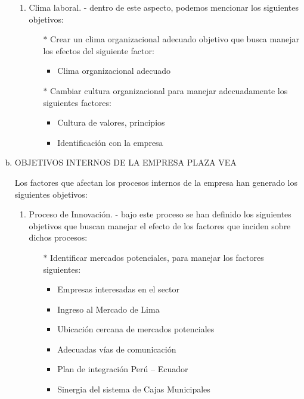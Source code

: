 \begin{enumerate}[a)]
\begin{enumerate}[1.]
  			  \item Clima laboral. - dentro de este aspecto, podemos mencionar los siguientes objetivos:

				\begin{itemize}

				\item[$*$] Crear un clima organizacional adecuado objetivo que busca manejar los efectos del siguiente factor:

				\begin{itemize}

  				  \item Clima organizacional adecuado

				\end{itemize}


				\item[$*$] Cambiar cultura organizacional para manejar adecuadamente los siguientes factores:

				\begin{itemize}

  				  \item Cultura de valores, principios
				  \item Identificación con la empresa

				\end{itemize}


			\end{itemize}
    
		\end{enumerate}

	\item OBJETIVOS INTERNOS DE LA EMPRESA PLAZA VEA

	Los factores que afectan los procesos internos de la empresa han generado los siguientes objetivos:
		\begin{enumerate}[1.]

    		\item Proceso de Innovación. - bajo este proceso se han definido los siguientes objetivos que buscan manejar el efecto de los factores que inciden sobre dichos procesos:

			\begin{itemize}

				\item[$*$] Identificar mercados potenciales, para manejar los factores siguientes:

				\begin{itemize}

  				  \item Empresas interesadas en el sector
				\item Ingreso al Mercado de Lima
				\item Ubicación cercana de mercados potenciales
				\item Adecuadas vías de comunicación
				\item Plan de integración Perú – Ecuador
				\item Sinergia del sistema de Cajas Municipales


\end{itemize}
\end{itemize}
\end{enumerate}
\end{enumerate}
